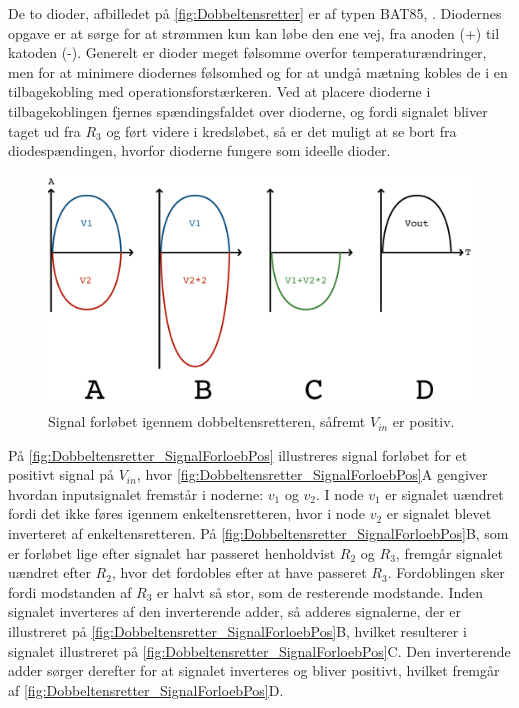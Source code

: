 De to dioder, afbilledet på \autoref{fig:Dobbeltensretter} er af typen BAT85, \parencite{PDF:Diode}. Diodernes opgave er at sørge for at strømmen kun kan løbe den ene vej, fra anoden (+) til katoden (-). Generelt er dioder meget følsomme overfor temperaturændringer, men for at minimere diodernes følsomhed og for at undgå mætning kobles de i en tilbagekobling med operationsforstærkeren. Ved at placere dioderne i tilbagekoblingen fjernes spændingsfaldet over dioderne, og fordi signalet bliver taget ud fra $R_3$ og ført videre i kredsløbet, så er det muligt at se bort fra diodespændingen, hvorfor dioderne fungere som ideelle dioder.
%
\begin{figure}[H]
	\centering
	\includegraphics[resolution=300,scale=\circuitSize]{Figure/Circuits/Dobbeltensretter_SignalForloeb_Positive.pdf}
	\caption{Signal forløbet igennem dobbeltensretteren, såfremt $V_{in}$ er positiv.}
	\label{fig:Dobbeltensretter_SignalForloebPos}
\end{figure}
\noindent
%
På \autoref{fig:Dobbeltensretter_SignalForloebPos} illustreres signal forløbet  for et positivt signal på $V_{in}$, hvor \autoref{fig:Dobbeltensretter_SignalForloebPos}A gengiver hvordan inputsignalet fremstår i noderne: $v_1$ og $v_2$. I node $v_1$ er signalet uændret fordi det ikke føres igennem enkeltensretteren, hvor i node $v_2$ er signalet blevet inverteret af enkeltensretteren. På \autoref{fig:Dobbeltensretter_SignalForloebPos}B, som er forløbet lige efter signalet har passeret henholdvist $R_2$ og $R_3$, fremgår signalet uændret efter $R_2$, hvor det fordobles efter at have passeret $R_3$. Fordoblingen sker fordi modstanden af $R_3$ er halvt så stor, som de resterende modstande. Inden signalet inverteres af den inverterende adder, så adderes signalerne, der er illustreret på \autoref{fig:Dobbeltensretter_SignalForloebPos}B, hvilket resulterer i signalet illustreret på \autoref{fig:Dobbeltensretter_SignalForloebPos}C. Den inverterende adder sørger derefter for at signalet inverteres og bliver positivt, hvilket fremgår af \autoref{fig:Dobbeltensretter_SignalForloebPos}D. 
